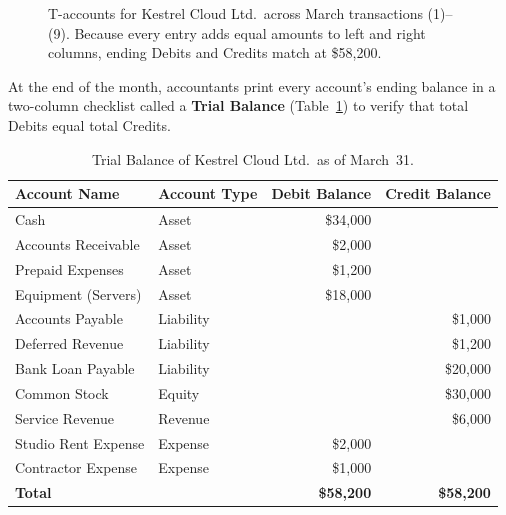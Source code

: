 \begin{figure}[htbp]
\caption{T-accounts for Kestrel Cloud Ltd.\ across March transactions (1)--(9). Because every entry adds equal amounts to left and right columns, ending Debits and Credits match at \$58,200.}
\label{fig:ch01-t-accounts}
\end{figure}

At the end of the month, accountants print every account's ending balance in a two-column checklist called a \textbf{Trial Balance} (Table~\ref{tab:ch01-trial-balance}) to verify that total Debits equal total Credits.

\begin{table}[htbp]
\centering
\small
\begin{tabular}{@{}llrr@{}}
\toprule
\textbf{Account Name} & \textbf{Account Type} & \textbf{Debit Balance} & \textbf{Credit Balance} \\
\midrule
Cash                           & Asset          & \$34,000  &           \\
Accounts Receivable            & Asset          & \$2,000   &           \\
Prepaid Expenses               & Asset          & \$1,200   &           \\
Equipment (Servers)            & Asset          & \$18,000  &           \\
Accounts Payable               & Liability      &           & \$1,000   \\
Deferred Revenue               & Liability      &           & \$1,200   \\
Bank Loan Payable              & Liability      &           & \$20,000  \\
Common Stock                   & Equity         &           & \$30,000  \\
Service Revenue                & Revenue        &           & \$6,000   \\
Studio Rent Expense            & Expense        & \$2,000   &           \\
Contractor Expense             & Expense        & \$1,000   &           \\
\midrule
\textbf{Total}                 &                & \textbf{\$58,200} & \textbf{\$58,200} \\
\bottomrule
\end{tabular}
\caption{Trial Balance of Kestrel Cloud Ltd.\ as of March~31.}
\label{tab:ch01-trial-balance}
\end{table}

